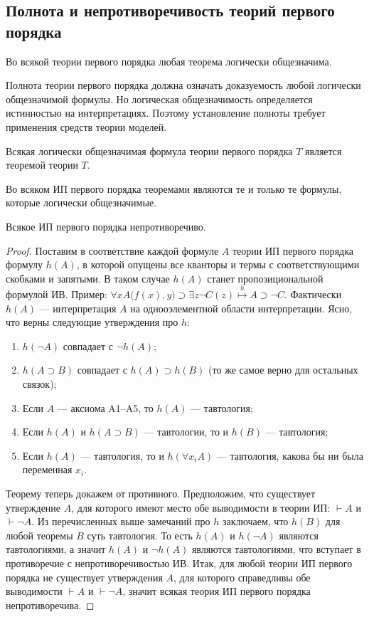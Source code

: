 \subsection{Полнота и непротиворечивость теорий первого порядка}
\begin{lemma}
    Во всякой теории первого порядка любая теорема логически общезначима.
\end{lemma}
Полнота теории первого порядка должна означать доказуемость любой логически общезначимой формулы. Но логическая общезначимость определяется истинностью на интерпретациях. Поэтому установление полноты требует применения средств теории моделей.
\begin{lemma}
    Всякая логически общезначимая формула теории первого порядка $T$ является теоремой теории $T$.
\end{lemma}
\begin{theorem}
    Во всяком ИП первого порядка теоремами являются те и только те формулы, которые логически общезначимые.
\end{theorem}
\begin{theorem}
    Всякое ИП первого порядка непротиворечиво.
\end{theorem}
\begin{proof}
    Поставим в соответствие каждой формуле $A$ теории ИП первого порядка формулу $h(A)$, в которой опущены все кванторы и термы с соответствующими скобками и запятыми. В таком случае $h(A)$ станет пропозициональной формулой ИВ. Пример: $\forall xA\big(f(x), y\big) \supset \exists z\neg C(z) \overset{h}{\longmapsto} A \supset \neg C$. Фактически $h(A)$ --- интерпретация $A$ на однооэлементной области интерпретации. Ясно, что верны следующие утверждения про $h$:
    \begin{enumerate}
        \item $h(\neg A)$ совпадает с $\neg h(A)$;
        \item $h(A \supset B)$ совпадает с $h(A) \supset h(B)$ (то же самое верно для остальных связок);
        \item Если $A$ --- аксиома A1--A5, то $h(A)$ --- тавтология;
        \item Если $h(A)$ и $h(A \supset B)$ --- тавтологии, то и $h(B)$ --- тавтология;
        \item Если $h(A)$ --- тавтология, то и $h(\forall x_iA)$ --- тавтология, какова бы ни была переменная $x_i$.
    \end{enumerate}
    Теорему теперь докажем от противного. Предположим, что существует утверждение $A$, для которого имеют место обе выводимости в теории ИП: $\vdash A$ и $\vdash \neg A$. Из перечисленных выше замечаний про $h$ заключаем, что $h(B)$ для любой теоремы $B$ суть тавтология. То есть $h(A)$ и $h(\neg A)$ являются тавтологиями, а значит $h(A)$ и $\neg h(A)$ являются тавтологиями, что вступает в противоречие с непротиворечивостью ИВ. Итак, для любой теории ИП первого порядка не существует утверждения $A$, для которого справедливы обе выводимости $\vdash A$ и $\vdash \neg A$, значит всякая теория ИП первого порядка непротиворечива.
\end{proof}